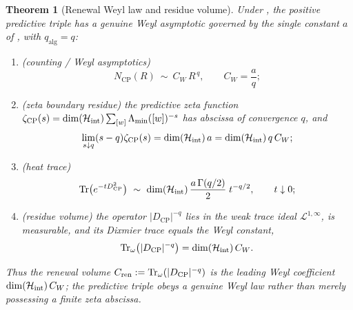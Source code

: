 \documentclass[11pt]{article}
\newtheorem{theorem}{Theorem}[section]
\theoremstyle{definition}
\theoremstyle{remark}
\newcommand{\Hh}{\mathcal{H}}
\newcommand{\CP}{\mathrm{CP}}
\newcommand{\qalg}{q_{\mathrm{alg}}}
\newcommand{\Lam}{\Lambda}
\newcommand{\Tr}{\operatorname{Tr}}
\begin{document}
\begin{theorem}[Renewal Weyl law and residue volume]
\label{thm:weyl-law}
Under , the positive predictive triple has
a genuine Weyl asymptotic governed by the single constant $a$ of
, with $\qalg=q$:
\begin{enumerate}[label=\textup{(\roman*)},leftmargin=2.4em]
\item \textup{(counting / Weyl asymptotics)}
      \[
        N_{\CP}(R)\ \sim\ C_W\,R^{\,q},\qquad C_W=\frac{a}{q};
      \]
\item \textup{(zeta boundary residue)} the predictive zeta function
      $\zeta_{\CP}(s)=\dim(\Hh_{\rm int})\sum_{[w]}\Lam_{\min}([w])^{-s}$ has
      abscissa of convergence $q$, and
      \[
        \lim_{s\downarrow q}(s-q)\zeta_{\CP}(s)
        =\dim(\Hh_{\rm int})\,a
        =\dim(\Hh_{\rm int})\,q\,C_W;
      \]
\item \textup{(heat trace)}
      \[
        \Tr\bigl(e^{-tD_{\CP}^2}\bigr)\ \sim\
        \dim(\Hh_{\rm int})\,\frac{a\,\Gamma(q/2)}{2}\;t^{-q/2},
        \qquad t\downarrow0;
      \]
\item \textup{(residue volume)} the operator $|D_{\CP}|^{-q}$ lies in the weak
      trace ideal $\mathcal L^{1,\infty}$, is measurable, and its Dixmier trace
      equals the Weyl constant,
      \[
        \Tr_\omega\bigl(|D_{\CP}|^{-q}\bigr)
        =\dim(\Hh_{\rm int})\,C_W .
      \]
\end{enumerate}
Thus the renewal volume $C_{\rm ren}:=\Tr_\omega(|D_{\CP}|^{-q})$ is the leading
Weyl coefficient $\dim(\Hh_{\rm int})\,C_W$; the predictive triple obeys a
genuine Weyl law rather than merely possessing a finite zeta abscissa.
\end{theorem}
\end{document}
